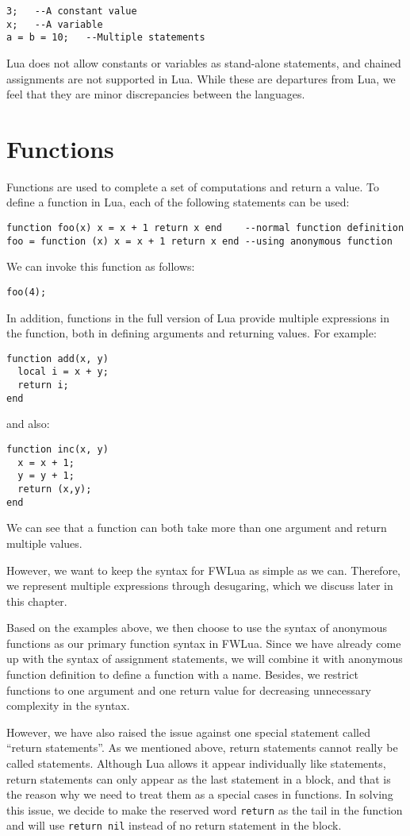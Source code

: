 \begin{verbatim}
3;   --A constant value
x;   --A variable
a = b = 10;   --Multiple statements
\end{verbatim}

Lua does not allow constants or variables as stand-alone statements,
and chained assignments are not supported in Lua.
While these are departures from Lua, we feel that they are minor discrepancies between the languages.

\section{Functions}
Functions are used to complete a set of computations and return a value.
To define a function in Lua, each of the following statements can be used:
\begin{verbatim}
function foo(x) x = x + 1 return x end    --normal function definition
foo = function (x) x = x + 1 return x end --using anonymous function
\end{verbatim}
We can invoke this function as follows:
\begin{verbatim}
foo(4);
\end{verbatim}
In addition, functions in the full version of Lua provide multiple expressions in the function, both in defining arguments and returning values. For example:
\begin{verbatim}
function add(x, y)
  local i = x + y;
  return i;
end
\end{verbatim}
and also:
\begin{verbatim}
function inc(x, y)
  x = x + 1;
  y = y + 1;
  return (x,y);
end
\end{verbatim}
We can see that a function can both take more than one argument and return multiple values.

However, we want to keep the syntax for FWLua as simple as we can. Therefore, we represent multiple expressions through desugaring, which we discuss later in this chapter.

Based on the examples above, we then choose to use the syntax of anonymous functions as our primary function syntax in FWLua. Since we have already come up with the syntax of assignment statements, we will combine it with anonymous function definition to define a function with a name. Besides, we restrict functions to one argument and one return value for decreasing unnecessary complexity in the syntax.

However, we have also raised the issue against one special statement called ``return statements''. As we mentioned above, return statements cannot really be called statements. Although Lua allows it appear individually like statements, return statements can only appear as the last statement in a block, and that is the reason why we need to treat them as a special cases in functions. In solving this issue, we decide to make the reserved word {\tt return} as the tail in the function and will use {\tt return nil} instead of no return statement in the block.

